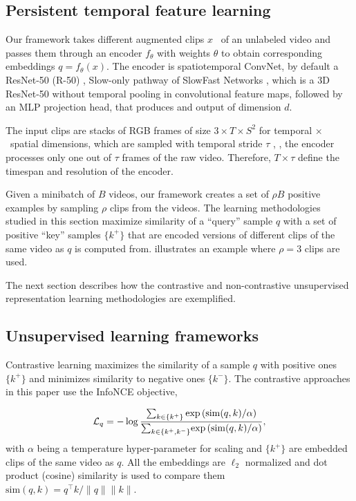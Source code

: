 \documentclass[final]{cvpr}
\def\x{$\times$}
\begin{document}
	\subsection{Persistent temporal feature learning}
	Our framework takes different augmented clips $x$ \ of an unlabeled video and passes them through an encoder $f_\theta$ with weights $\theta$ to obtain corresponding embeddings $q = f_\theta(x)$. The encoder is spatiotemporal ConvNet, by default a \mbox{ResNet-50} (R-50) \cite{He16}, Slow-only pathway of SlowFast Networks \cite{Feichtenhofer19}, which is a 3D ResNet-50 \cite{He16} without temporal pooling in convolutional feature maps, followed by an MLP projection head, that produces and output of dimension $d$.  
	
	The input clips are  stacks of RGB frames of size \mbox{$3\times T\times S^2$} for  temporal \x~spatial dimensions, which are sampled with temporal stride $\tau$ , \ie, the encoder processes only one out of $\tau$ frames of the raw video. Therefore, $T \times \tau$ define the timespan and resolution of the encoder. 
	
	Given a minibatch of $B$ videos, our framework creates a set of $\rho B$ positive examples by sampling $\rho$ clips from the videos. The learning methodologies studied in this section maximize  similarity of a ``query'' sample $q$ with a set of positive ``key'' samples $\{k^{+}\}$ that are encoded  versions of different clips of the same video as $q$ is computed from. 
	 illustrates an example where $\rho{=}$3 clips are used.
	
	The next section describes how the contrastive and non-contrastive unsupervised representation learning methodologies are exemplified.
	\subsection{Unsupervised learning frameworks} \label{sec:contrastive}
	Contrastive learning maximizes the similarity of a sample $q$ with positive ones  $\{k^{+}\}$ and minimizes similarity to negative ones $\{k^{-}\}$. The contrastive approaches in this paper use the  \mbox{InfoNCE} \cite{Oord18} objective,
	
	\begin{equation}\label{eq:infonce} 	\small
		\mathcal{L}_{q} = -\log{\frac{ {\sum_{k \in \{k^+\}}} \exp\left({\mathrm{sim}(q, k) / \alpha}\right)}{ {\sum_{k \in \{k^+, k^-\}}} {\exp\left({\mathrm{sim}(q, k) / \alpha}\right)}   }},
	\end{equation}
	with $\alpha$ being a temperature hyper-parameter for scaling and $\{k^{+}\}$ are embedded clips of the same video as $q$.
	All the embeddings are $\ell_2$  normalized and dot product (cosine) similarity is used to compare them $\mathrm{sim}(q, k) = q^\top k / \lVert q\rVert \lVert k\rVert$.
	
\end{document}
